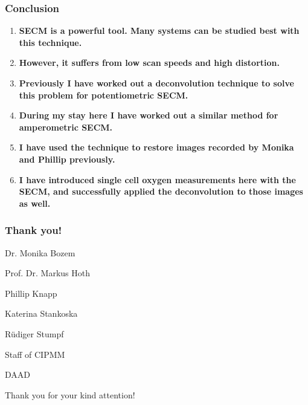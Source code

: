 \documentclass{beamer}
\begin{document}
\begin{frame}
\frametitle{Conclusion}
\begin{enumerate}
\item \textbf{SECM is a powerful tool. Many systems can be studied best with this technique.}
\item \textbf{However, it suffers from low scan speeds and high distortion.}
\item \textbf{Previously I have worked out a deconvolution technique to solve this problem for potentiometric SECM.}
\item \textbf{During my stay here I have worked out a similar method for amperometric SECM.}
\item \textbf{I have used the technique to restore images recorded by Monika and Phillip previously.}
\item \textbf{I have introduced single cell oxygen measurements here with the SECM, and successfully applied the deconvolution to those images as well.}

\end{enumerate}
\end{frame}

\begin{frame} %

\centering
\frametitle{Thank you!}

Dr. Monika Bozem

Prof. Dr. Markus Hoth

Phillip Knapp

Katerina Stankoska

Rüdiger Stumpf

Staff of CIPMM

\vspace{1 cm}

DAAD

\vspace{1 cm}

Thank you for your kind attention!

\end{frame}
\end{document}
